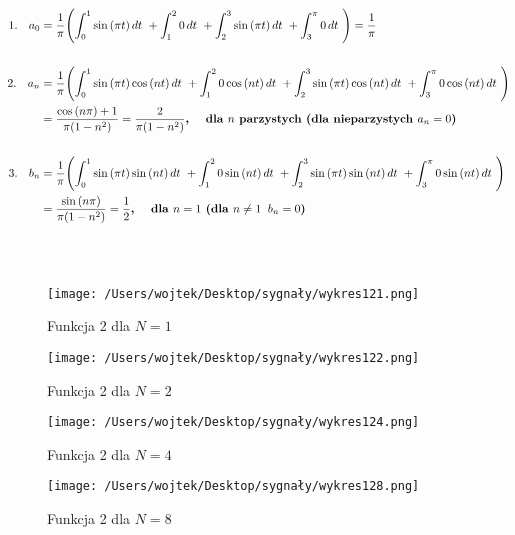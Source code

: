 \documentclass[leqno,a4paper]{article}
\begin{document}
\begin{align*}
1.\hspace{0.34cm}a_0 &= \frac{1}{\pi}\Biggl(\int_{0}^{1}\sin{(\pi t)}\,dt\ + \int_{1}^{2}0\,dt\ +\int_{2}^{3}\sin{(\pi t)}\,dt\ +\int_{3}^{\pi}0\,dt\  \Biggr) = \frac{1}{\pi}
\\\\
2.\hspace{0.34cm}a_n &= \frac{1}{\pi}\Biggl(\int_{0}^{1}\sin{(\pi t)}\cos{(nt)}\,dt\ + \int_{1}^{2}0\cos{(nt)}\,dt\ +\int_{2}^{3}\sin{(\pi t)}\cos{(nt)}\,dt\ +\int_{3}^{\pi}0\cos{(nt)}\,dt\  \Biggr) \\ &= 
\frac{\cos{(n \pi)}+1}{\pi(1-n^2)} = \frac{2}{\pi(1-n^2)}\textbf{,} \hspace{0.5cm}\textbf{dla $n$ parzystych (dla nieparzystych $a_n = 0$)}
\\\\
3.\hspace{0.34cm}b_n &= \frac{1}{\pi}\Biggl(\int_{0}^{1}\sin{(\pi t)}\sin{(nt)}\,dt\ + \int_{1}^{2}0\sin{(nt)}\,dt\ +\int_{2}^{3}\sin{(\pi t)}\sin{(nt)}\,dt\ +\int_{3}^{\pi}0\sin{(nt)}\,dt\  \Biggr) \\ &=
\frac{\sin{(n \pi)}}{\pi(1-n^2)} = \frac{1}{2}\textbf{,} \hspace{0.5cm}\textbf{dla $n = 1$ (dla $n \neq 1\hspace{0.2cm}b_n = 0$)}
\end{align*}
\\\\

\begin{figure}
  \texttt{[image: /Users/wojtek/Desktop/sygnały/wykres121.png]}
  \caption{Funkcja 2 dla $N=1$}
  \centering
\end{figure}

\begin{figure}
  \texttt{[image: /Users/wojtek/Desktop/sygnały/wykres122.png]}
  \centering
    \caption{Funkcja 2 dla $N=2$}
\end{figure}

\begin{figure}
  \texttt{[image: /Users/wojtek/Desktop/sygnały/wykres124.png]}
  \centering
   \caption{Funkcja 2 dla $N=4$}
\end{figure}

\begin{figure}
  \texttt{[image: /Users/wojtek/Desktop/sygnały/wykres128.png]}
  \centering
  \caption{Funkcja 2 dla $N=8$}
\end{figure}
\end{document}
